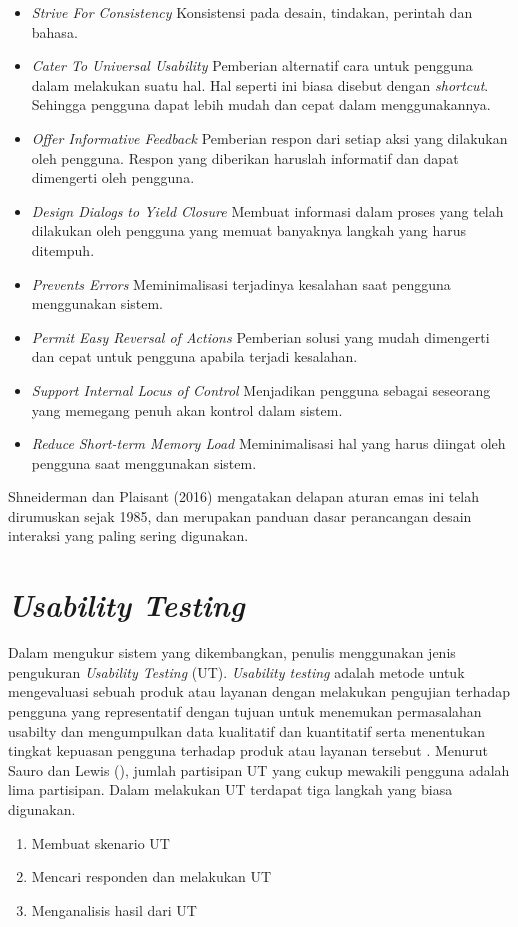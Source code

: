 \begin{itemize}
	\item \textit{Strive For Consistency}
	\subitem Konsistensi pada desain, tindakan, perintah dan bahasa.
	\item \textit{Cater To Universal Usability}
	\subitem Pemberian alternatif cara untuk pengguna dalam melakukan suatu hal. Hal seperti ini biasa disebut dengan \textit{shortcut}. Sehingga pengguna dapat lebih mudah dan cepat dalam menggunakannya.
	\item \textit{Offer Informative Feedback}
	\subitem Pemberian respon dari setiap aksi yang dilakukan oleh pengguna. Respon yang diberikan haruslah informatif dan dapat dimengerti oleh pengguna.
	\item \textit{Design Dialogs to Yield Closure}
	\subitem Membuat informasi dalam proses yang telah dilakukan oleh pengguna yang memuat banyaknya langkah yang harus ditempuh.
	\item \textit{Prevents Errors}
	\subitem Meminimalisasi terjadinya kesalahan saat pengguna menggunakan sistem.
	\item \textit{Permit Easy Reversal of Actions}
	\subitem Pemberian solusi yang mudah dimengerti dan cepat untuk pengguna apabila terjadi kesalahan.
	\item \textit{Support Internal Locus of Control}
	\subitem Menjadikan pengguna sebagai seseorang yang memegang penuh akan kontrol dalam sistem.
	\item \textit{Reduce Short-term Memory Load}
	\subitem Meminimalisasi hal yang harus diingat oleh pengguna saat menggunakan sistem.
\end{itemize}

Shneiderman dan Plaisant (2016) mengatakan delapan aturan emas ini telah dirumuskan sejak 1985, dan merupakan panduan dasar perancangan desain interaksi yang paling sering digunakan.
	
\section{\textit{Usability Testing}}

Dalam mengukur sistem yang dikembangkan, penulis menggunakan jenis pengukuran \textit{Usability Testing} (UT). \textit{Usability testing} adalah metode untuk mengevaluasi sebuah produk atau layanan dengan melakukan pengujian terhadap pengguna yang representatif dengan tujuan untuk menemukan permasalahan usabilty dan mengumpulkan data kualitatif dan kuantitatif serta menentukan tingkat kepuasan pengguna terhadap produk atau layanan tersebut \citep{article.usability}.
	\linebreak\linebreak
	Menurut Sauro dan Lewis (\citeyear{papper.lewis}), jumlah partisipan UT yang cukup mewakili pengguna adalah lima partisipan. Dalam melakukan UT terdapat tiga langkah yang biasa digunakan.
	\begin{enumerate}
		\item Membuat skenario UT
		\item Mencari responden dan melakukan UT
		\item Menganalisis hasil dari UT
	\end{enumerate}